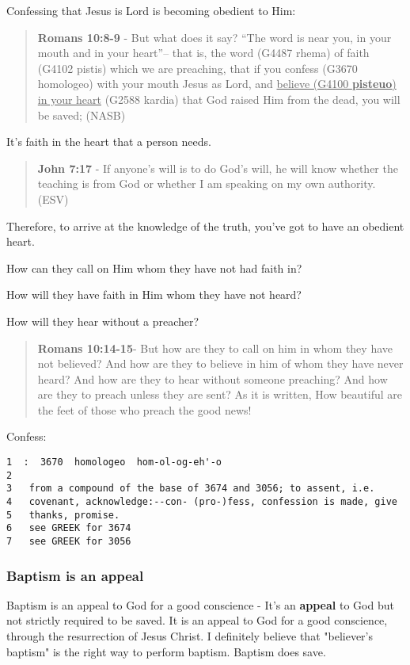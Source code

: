 \documentclass[11pt]{article}
\begin{document}
Confessing that Jesus is Lord is becoming obedient to Him:

\begin{quote}
\textbf{Romans 10:8-9} - But what does it say? “The word is near you, in your mouth and in your heart”-- that is, the word (G4487 rhema) of faith (G4102 pistis) which we are preaching, that if you confess (G3670 homologeo) with your mouth Jesus as Lord, and \uline{believe (G4100 \textbf{pisteuo}) in your heart} (G2588 kardia) that God raised Him from the dead, you will be saved; (NASB)
\end{quote}

It's faith in the heart that a person needs.

\begin{quote}
\textbf{John 7:17} -  If anyone's will is to do God's will, he will know whether the teaching is from God or whether I am speaking on my own authority.  (ESV)
\end{quote}

Therefore, to arrive at the knowledge of the truth, you've got to have an obedient heart.

How can they call on Him whom they have not had faith in?

How will they have faith in Him whom they have not heard?

How will they hear without a preacher?

\begin{quote}
\textbf{Romans 10:14-15}- But how are they to call on him in whom they have not believed? And how are they to believe in him of whom they have never heard? And how are they to hear without someone preaching? And how are they to preach unless they are sent? As it is written, How beautiful are the feet of those who preach the good news!
\end{quote}

Confess:

\begin{verbatim}
1  :  3670  homologeo  hom-ol-og-eh'-o
2  
3   from a compound of the base of 3674 and 3056; to assent, i.e.
4   covenant, acknowledge:--con- (pro-)fess, confession is made, give
5   thanks, promise.
6   see GREEK for 3674
7   see GREEK for 3056
\end{verbatim}

\subsubsection{Baptism is an appeal}
\label{sec:org4fb7f74}
Baptism is an appeal to God for a good conscience - It's an \textbf{appeal} to God but not strictly required to be saved.
It is an appeal to God for a good conscience, through the resurrection of Jesus Christ.
I definitely believe that "believer's baptism" is the right way to perform baptism.
Baptism does save.
\end{document}
